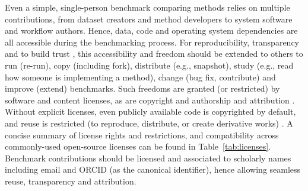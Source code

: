 \documentclass[11pt]{article}
\begin{document}
Even a simple, single-person benchmark comparing methods relies on multiple contributions, from dataset creators and method developers to system software and workflow authors. Hence, data, code and operating system dependencies are all accessible during the benchmarking process. For reproducibility, transparency and to build trust \cite{Laine2007-py}, this accessibility and freedom should be extended to others to run (re-run), copy (including fork), distribute (e.g., snapshot), study (e.g., read how someone is implementing a method), change (bug fix, contribute) and improve (extend) benchmarks. Such freedoms are granted (or restricted) by software and content licenses, as are copyright and authorship and attribution \cite{Kreutzer2014-ua}. Without explicit licenses, even publicly available code is copyrighted by default, and reuse is restricted (to reproduce, distribute, or create derivative works) \cite{Kreutzer2014-ua}. A concise summary of license rights and restrictions, and compatibility across commonly-used open-source licenses can be found in Table~\ref{tab:licenses}. Benchmark contributions should be licensed and associated to scholarly names including email and ORCID (as the canonical identifier), hence allowing seamless reuse, transparency and attribution.
\end{document}
